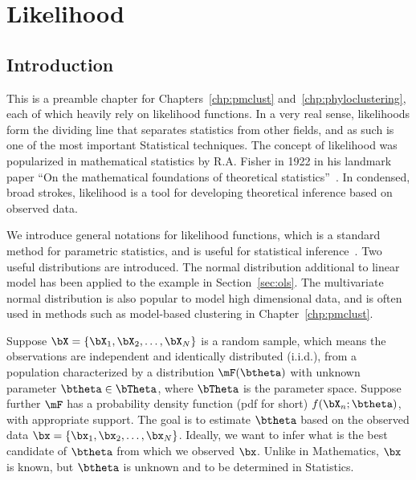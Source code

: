 
\chapter{Likelihood}
\label{chp:likelihood}




\section{Introduction}
\label{sec:likelihood_introduction}

This is a preamble chapter for Chapters~\ref{chp:pmclust}
and~\ref{chp:phyloclustering}, each of which heavily rely on
likelihood functions.  In a very real sense, 
likelihoods form the dividing line that separates statistics from other 
fields, and as such is one of the most important Statistical 
techniques.  The concept of likelihood was popularized
in mathematical statistics by R.A. Fisher in 1922 in his landmark paper
``On the mathematical foundations of theoretical
statistics''~\citep{Fisher1922}.
In condensed, broad strokes, likelihood is a tool for developing theoretical 
inference based on observed data.

We introduce general notations for likelihood functions,
which is a standard method for parametric statistics, and is
useful for statistical inference~\citep{Casella2001}.
Two useful distributions are introduced.
The normal distribution additional to linear model has been applied to
the example in Section~\ref{sec:ols}.
The multivariate normal
distribution
is also popular to model high dimensional data, and is often used in methods 
such as model-based clustering in Chapter~\ref{chp:pmclust}.

Suppose $\bX = \{\bX_1, \bX_2, \ldots, \bX_N\}$ is a random sample,
which means the observations are independent and identically distributed
(i.i.d.),
from a population characterized by a distribution $\mF(\btheta)$ with unknown
parameter $\btheta \in \bTheta$, where $\bTheta$ is the parameter space.
Suppose further $\mF$ has a probability density function
(pdf for short)
$f(\bX_n; \btheta)$, with appropriate support.
The goal is to estimate $\btheta$ based on the observed data
$\bx = \{\bx_1, \bx_2, \ldots, \bx_N\}$.
Ideally, we want to infer what is the best candidate of $\btheta$
from which we observed $\bx$.
Unlike in Mathematics, $\bx$ is known, but $\btheta$ is unknown and
to be determined in Statistics.


